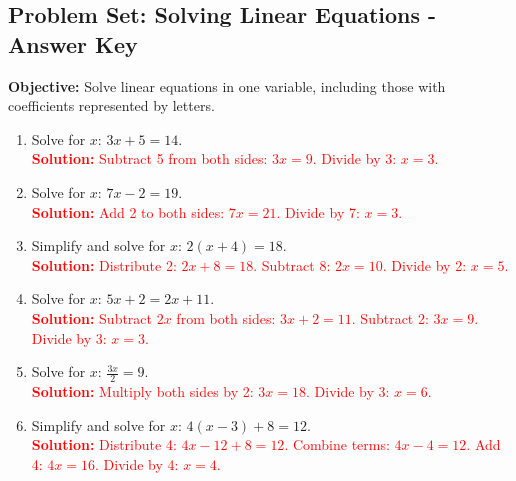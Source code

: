 \documentclass[11pt]{article}
\title{}
\date{}
\begin{document}
\subsection*{Problem Set: Solving Linear Equations - Answer Key}
\onehalfspacing

\begin{tcolorbox}[colframe=black!40, colback=gray!5, 
coltitle=black, colbacktitle=black!20, fonttitle=\bfseries\Large, 
title=Learning Objective, halign title=center, left=5pt, right=5pt, top=5pt, bottom=15pt]
\textbf{Objective:} Solve linear equations in one variable, including those with coefficients represented by letters.
\end{tcolorbox}

\begin{tcolorbox}[colframe=black!60, colback=white, 
coltitle=black, colbacktitle=black!15, fonttitle=\bfseries\Large, 
title=Exercises, halign title=center, left=10pt, right=10pt, top=10pt, bottom=60pt]
\begin{enumerate}[itemsep=3em]
    \item Solve for \(x\): \( 3x + 5 = 14 \).\\
    \textcolor{red}{\textbf{Solution:} Subtract 5 from both sides: \(3x = 9\). Divide by 3: \(x = 3\).}

    \item Solve for \(x\): \( 7x - 2 = 19 \).\\
    \textcolor{red}{\textbf{Solution:} Add 2 to both sides: \(7x = 21\). Divide by 7: \(x = 3\).}

    \item Simplify and solve for \(x\): \( 2(x + 4) = 18 \).\\
    \textcolor{red}{\textbf{Solution:} Distribute 2: \(2x + 8 = 18\). Subtract 8: \(2x = 10\). Divide by 2: \(x = 5\).}

    \item Solve for \(x\): \( 5x + 2 = 2x + 11 \).\\
    \textcolor{red}{\textbf{Solution:} Subtract \(2x\) from both sides: \(3x + 2 = 11\). Subtract 2: \(3x = 9\). Divide by 3: \(x = 3\).}

    \item Solve for \(x\): \( \frac{3x}{2} = 9 \).\\
    \textcolor{red}{\textbf{Solution:} Multiply both sides by 2: \(3x = 18\). Divide by 3: \(x = 6\).}

    \item Simplify and solve for \(x\): \( 4(x - 3) + 8 = 12 \).\\
    \textcolor{red}{\textbf{Solution:} Distribute 4: \(4x - 12 + 8 = 12\). Combine terms: \(4x - 4 = 12\). Add 4: \(4x = 16\). Divide by 4: \(x = 4\).}


\end{enumerate}
\end{tcolorbox}
\end{document}
